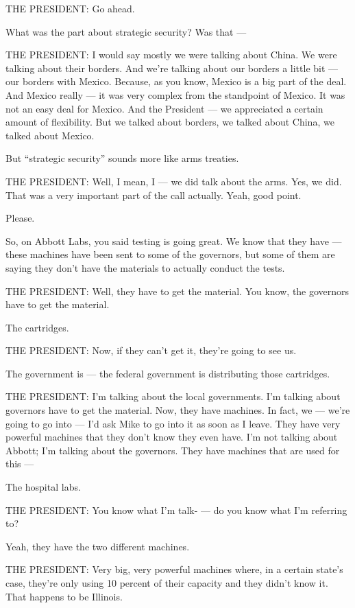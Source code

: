 THE PRESIDENT: Go ahead.

What was the part about strategic security? Was that ---

THE PRESIDENT: I would say mostly we were talking about China. We were
talking about their borders. And we're talking about our borders a
little bit --- our borders with Mexico. Because, as you know, Mexico is
a big part of the deal. And Mexico really --- it was very complex from
the standpoint of Mexico. It was not an easy deal for Mexico. And the
President --- we appreciated a certain amount of flexibility. But we
talked about borders, we talked about China, we talked about Mexico.

But ``strategic security'' sounds more like arms treaties.

THE PRESIDENT: Well, I mean, I --- we did talk about the arms. Yes, we
did. That was a very important part of the call actually. Yeah, good
point.

Please.

So, on Abbott Labs, you said testing is going great. We know that they
have --- these machines have been sent to some of the governors, but
some of them are saying they don't have the materials to actually
conduct the tests.

THE PRESIDENT: Well, they have to get the material. You know, the
governors have to get the material.

The cartridges.

THE PRESIDENT: Now, if they can't get it, they're going to see us.

The government is --- the federal government is distributing those
cartridges.

THE PRESIDENT: I'm talking about the local governments. I'm talking
about governors have to get the material. Now, they have machines. In
fact, we --- we're going to go into --- I'd ask Mike to go into it as
soon as I leave. They have very powerful machines that they don't know
they even have. I'm not talking about Abbott; I'm talking about the
governors. They have machines that are used for this ---

The hospital labs.

THE PRESIDENT: You know what I'm talk- --- do you know what I'm
referring to?

Yeah, they have the two different machines.

THE PRESIDENT: Very big, very powerful machines where, in a certain
state's case, they're only using 10 percent of their capacity and they
didn't know it. That happens to be Illinois.

